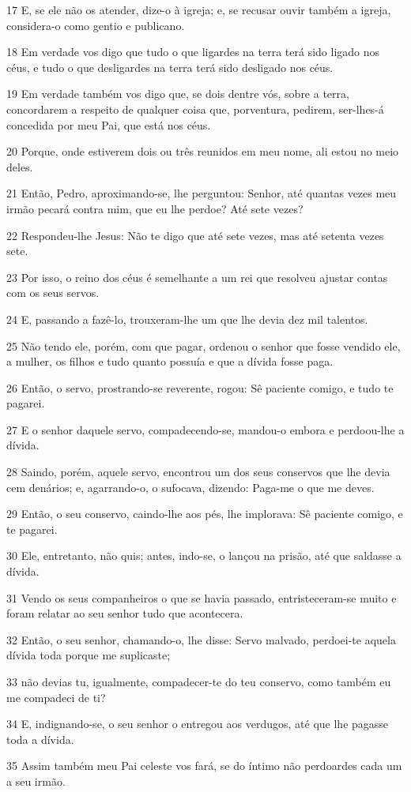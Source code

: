 \par 17 E, se ele não os atender, dize-o à igreja; e, se recusar ouvir também a igreja, considera-o como gentio e publicano.
\par 18 Em verdade vos digo que tudo o que ligardes na terra terá sido ligado nos céus, e tudo o que desligardes na terra terá sido desligado nos céus.
\par 19 Em verdade também vos digo que, se dois dentre vós, sobre a terra, concordarem a respeito de qualquer coisa que, porventura, pedirem, ser-lhes-á concedida por meu Pai, que está nos céus.
\par 20 Porque, onde estiverem dois ou três reunidos em meu nome, ali estou no meio deles.
\par 21 Então, Pedro, aproximando-se, lhe perguntou: Senhor, até quantas vezes meu irmão pecará contra mim, que eu lhe perdoe? Até sete vezes?
\par 22 Respondeu-lhe Jesus: Não te digo que até sete vezes, mas até setenta vezes sete.
\par 23 Por isso, o reino dos céus é semelhante a um rei que resolveu ajustar contas com os seus servos.
\par 24 E, passando a fazê-lo, trouxeram-lhe um que lhe devia dez mil talentos.
\par 25 Não tendo ele, porém, com que pagar, ordenou o senhor que fosse vendido ele, a mulher, os filhos e tudo quanto possuía e que a dívida fosse paga.
\par 26 Então, o servo, prostrando-se reverente, rogou: Sê paciente comigo, e tudo te pagarei.
\par 27 E o senhor daquele servo, compadecendo-se, mandou-o embora e perdoou-lhe a dívida.
\par 28 Saindo, porém, aquele servo, encontrou um dos seus conservos que lhe devia cem denários; e, agarrando-o, o sufocava, dizendo: Paga-me o que me deves.
\par 29 Então, o seu conservo, caindo-lhe aos pés, lhe implorava: Sê paciente comigo, e te pagarei.
\par 30 Ele, entretanto, não quis; antes, indo-se, o lançou na prisão, até que saldasse a dívida.
\par 31 Vendo os seus companheiros o que se havia passado, entristeceram-se muito e foram relatar ao seu senhor tudo que acontecera.
\par 32 Então, o seu senhor, chamando-o, lhe disse: Servo malvado, perdoei-te aquela dívida toda porque me suplicaste;
\par 33 não devias tu, igualmente, compadecer-te do teu conservo, como também eu me compadeci de ti?
\par 34 E, indignando-se, o seu senhor o entregou aos verdugos, até que lhe pagasse toda a dívida.
\par 35 Assim também meu Pai celeste vos fará, se do íntimo não perdoardes cada um a seu irmão.

